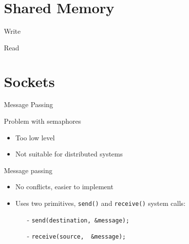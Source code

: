 
\section{Shared Memory}
\label{sec:shared-memory}

\begin{frame}{Write}
\begin{center}
\end{center}
\end{frame}

\begin{frame}{Read}
\begin{center}
\end{center}
\end{frame}

\section{Sockets}
\label{sec:sockets}

\begin{frame}{Message Passing}
  \begin{block}{Problem with semaphores}
    \begin{itemize}
    \item Too low level
    \item Not suitable for distributed systems
    \end{itemize}
  \end{block}
  \begin{block}{Message passing}
    \begin{itemize}
    \item No conflicts, easier to implement
    \item Uses two primitives, \texttt{send()} and \texttt{receive()} system calls:
      \begin{itemize}
      \item[-] \texttt{send(destination,\ \&message);}
      \item[-] \texttt{receive(source, \ \&message);}
      \end{itemize}
    \end{itemize}
  \end{block}
\end{frame}

